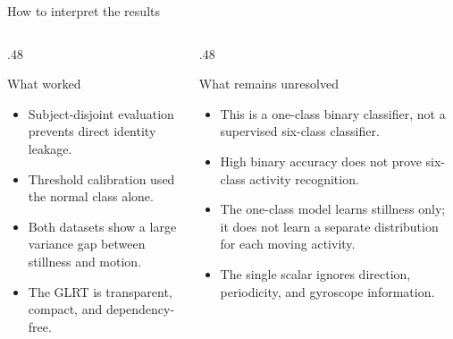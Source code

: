 \documentclass[aspectratio=169,10pt]{beamer}
\begin{document}
\begin{frame}{How to interpret the results}
  \begin{columns}[T,onlytextwidth]
    \begin{column}{.48\textwidth}
      \begin{block}{What worked}
        \begin{itemize}
          \item Subject-disjoint evaluation prevents direct identity leakage.
          \item Threshold calibration used the normal class alone.
          \item Both datasets show a large variance gap between stillness and motion.
          \item The GLRT is transparent, compact, and dependency-free.
        \end{itemize}
      \end{block}
    \end{column}
    \begin{column}{.48\textwidth}
      \begin{block}{What remains unresolved}
        \begin{itemize}
          \item This is a one-class binary classifier, not a supervised six-class classifier.
          \item High binary accuracy does not prove six-class activity recognition.
          \item The one-class model learns stillness only; it does not learn a separate distribution for each moving activity.
          \item The single scalar ignores direction, periodicity, and gyroscope information.
        \end{itemize}
      \end{block}
    \end{column}
  \end{columns}
\end{frame}

\end{document}
